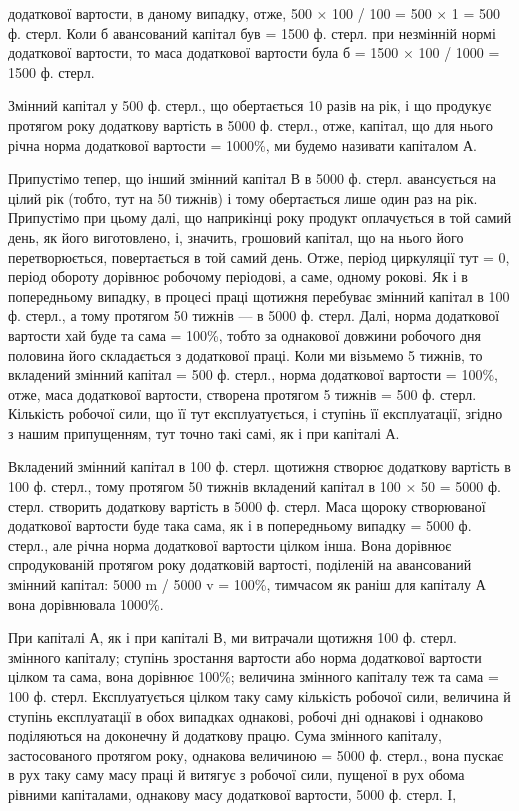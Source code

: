 \parcont{}  %
додаткової вартости, в даному випадку, отже, 500 × 100 / 100 = 500 × 1 = 500 ф. стерл. Коли б
авансований капітал був = 1500 ф. стерл. при незмінній
нормі додаткової вартости, то маса додаткової вартости була б =
1500 × 100 / 1000 = 1500 ф. стерл.

Змінний капітал у 500 ф. стерл., що обертається 10 разів на рік, і
що продукує протягом року додаткову вартість в 5000 ф. стерл., отже,
капітал, що для нього річна норма додаткової вартости = 1000\%, ми
будемо називати капіталом А.

Припустімо тепер, що інший змінний капітал В в 5000 ф. стерл.
авансується на цілий рік (тобто, тут на 50 тижнів) і тому обертається
лише один раз на рік. Припустімо при цьому далі, що наприкінці року
продукт оплачується в той самий день, як його виготовлено, і, значить,
грошовий капітал, що на нього його перетворюється, повертається в той
самий день. Отже, період циркуляції тут = 0, період обороту дорівнює
робочому періодові, а саме, одному рокові. Як і в попередньому випадку,
в процесі праці щотижня перебуває змінний капітал в 100 ф. стерл.,
а тому протягом 50 тижнів — в 5000 ф. стерл. Далі, норма додаткової
вартости хай буде та сама = 100\%, тобто за однакової довжини робочого
дня половина його складається з додаткової праці. Коли ми візьмемо
5 тижнів, то вкладений змінний капітал = 500 ф. стерл., норма додаткової
вартости = 100\%, отже, маса додаткової вартости, створена протягом
5 тижнів = 500 ф. стерл. Кількість робочої сили, що її тут експлуатується,
і ступінь її експлуатації, згідно з нашим припущенням, тут
точно такі самі, як і при капіталі А.

Вкладений змінний капітал в 100 ф. стерл. щотижня створює додаткову
вартість в 100 ф. стерл., тому протягом 50 тижнів вкладений капітал
в 100 × 50 = 5000 ф. стерл. створить додаткову вартість в 5000 ф. стерл. Маса щороку створюваної
додаткової вартости буде така сама, як і в попередньому випадку = 5000 ф. стерл., але річна норма
додаткової
вартости цілком інша. Вона дорівнює спродукованій протягом року
додатковій вартості, поділеній на авансований змінний капітал:
5000 m / 5000 v = 100\%, тимчасом як раніш для капіталу А вона дорівнювала 1000\%.

При капіталі А, як і при капіталі В, ми витрачали щотижня 100 ф. стерл. змінного капіталу; ступінь
зростання вартости або норма додаткової
вартости цілком та сама, вона дорівнює 100\%; величина змінного
капіталу теж та сама = 100 ф. стерл. Експлуатується цілком таку
саму кількість робочої сили, величина й ступінь експлуатації в обох випадках
однакові, робочі дні однакові і однаково поділяються на доконечну
й додаткову працю. Сума змінного капіталу, застосованого протягом
року, однакова величиною = 5000 ф. стерл., вона пускає в рух таку
саму масу праці й витягує з робочої сили, пущеної в рух обома рівними
капіталами, однакову масу додаткової вартости, 5000 ф. стерл. І,
\parbreak{}  %
